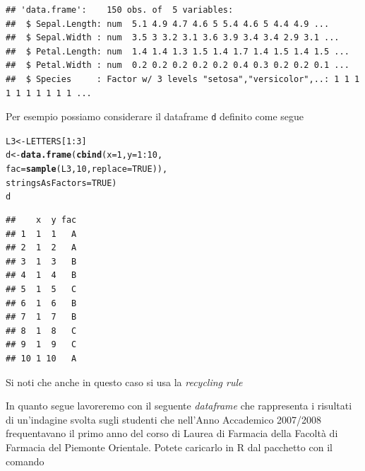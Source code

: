 \documentclass[onecolumn,12pt]{book}\usepackage[]{graphicx}\usepackage[]{color}
\makeatletter
\newcommand{\hlnum}[1]{\textcolor[rgb]{0.686,0.059,0.569}{#1}}%
\newcommand{\hlopt}[1]{\textcolor[rgb]{0,0,0}{#1}}%
\newcommand{\hlstd}[1]{\textcolor[rgb]{0.345,0.345,0.345}{#1}}%
\newcommand{\hlkwb}[1]{\textcolor[rgb]{0.69,0.353,0.396}{#1}}%
\newcommand{\hlkwc}[1]{\textcolor[rgb]{0.333,0.667,0.333}{#1}}%
\newcommand{\hlkwd}[1]{\textcolor[rgb]{0.737,0.353,0.396}{\textbf{#1}}}%
\newenvironment{kframe}{%
 \def\at@end@of@kframe{}%
 \ifinner\ifhmode%
  \def\at@end@of@kframe{\end{minipage}}%
  \begin{minipage}{\columnwidth}%
 \fi\fi%
 \def\FrameCommand##1{\hskip\@totalleftmargin \hskip-\fboxsep
 \colorbox{shadecolor}{##1}\hskip-\fboxsep
     \hskip-\linewidth \hskip-\@totalleftmargin \hskip\columnwidth}%
 \MakeFramed {\advance\hsize-\width
   \@totalleftmargin\z@ \linewidth\hsize
   \@setminipage}}%
 {\par\unskip\endMakeFramed%
 \at@end@of@kframe}
\newenvironment{knitrout}{}{} %
\makeatother
\begin{document}
\small
\begin{knitrout}
\color{fgcolor}\begin{kframe}
\begin{verbatim}
## 'data.frame':	150 obs. of  5 variables:
##  $ Sepal.Length: num  5.1 4.9 4.7 4.6 5 5.4 4.6 5 4.4 4.9 ...
##  $ Sepal.Width : num  3.5 3 3.2 3.1 3.6 3.9 3.4 3.4 2.9 3.1 ...
##  $ Petal.Length: num  1.4 1.4 1.3 1.5 1.4 1.7 1.4 1.5 1.4 1.5 ...
##  $ Petal.Width : num  0.2 0.2 0.2 0.2 0.2 0.4 0.3 0.2 0.2 0.1 ...
##  $ Species     : Factor w/ 3 levels "setosa","versicolor",..: 1 1 1 1 1 1 1 1 1 1 ...
\end{verbatim}
\end{kframe}
\end{knitrout}
\normalsize
Per esempio possiamo considerare il dataframe \texttt{d} definito come segue 
\begin{knitrout}
\color{fgcolor}\begin{kframe}
\begin{alltt}
\hlstd{L3} \hlkwb{<-} \hlstd{LETTERS[}\hlnum{1}\hlopt{:}\hlnum{3}\hlstd{]}
\hlstd{d} \hlkwb{<-} \hlkwd{data.frame}\hlstd{(}\hlkwd{cbind}\hlstd{(}\hlkwc{x}\hlstd{=}\hlnum{1}\hlstd{,} \hlkwc{y}\hlstd{=}\hlnum{1}\hlopt{:}\hlnum{10}\hlstd{,}
\hlkwc{fac}\hlstd{=}\hlkwd{sample}\hlstd{(L3,} \hlnum{10}\hlstd{,} \hlkwc{replace}\hlstd{=}\hlnum{TRUE}\hlstd{)),}
\hlkwc{stringsAsFactors}\hlstd{=}\hlnum{TRUE}\hlstd{)}
\hlstd{d}
\end{alltt}
\begin{verbatim}
##    x  y fac
## 1  1  1   A
## 2  1  2   A
## 3  1  3   B
## 4  1  4   B
## 5  1  5   C
## 6  1  6   B
## 7  1  7   B
## 8  1  8   C
## 9  1  9   C
## 10 1 10   A
\end{verbatim}
\end{kframe}
\end{knitrout}
Si noti che anche in questo caso si usa la \emph{recycling rule}

In quanto segue lavoreremo con il seguente \emph{dataframe} che rappresenta i risultati di un'indagine svolta sugli studenti che nell'Anno Accademico 2007/2008 frequentavano il primo anno del corso di Laurea di Farmacia della Facolt\`a di Farmacia del Piemonte Orientale. Potete caricarlo  in {\textsf R} dal pacchetto con il comando
\end{document}

